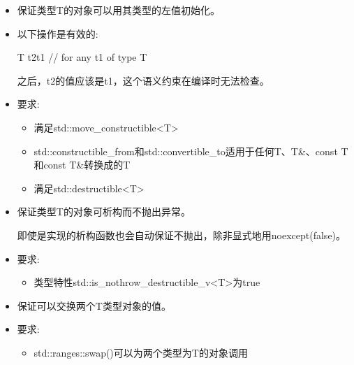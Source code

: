 \begin{itemize}
\item
保证类型T的对象可以用其类型的左值初始化。

\item
以下操作是有效的:

\begin{cpp}
T t2{t1} // for any t1 of type T
\end{cpp}

之后，t2的值应该是t1，这个语义约束在编译时无法检查。

\item
要求:
\begin{itemize}
\item
满足std::move\_constructible<T>

\item
std::constructible\_from和std::convertible\_to适用于任何T、T\&、const T和const T\&转换成的T

\item
满足std::destructible<T>
\end{itemize}
\end{itemize}


\begin{itemize}
\item
保证类型T的对象可析构而不抛出异常。

即使是实现的析构函数也会自动保证不抛出，除非显式地用noexcept(false)。

\item
要求:
\begin{itemize}
\item
类型特性std::is\_nothrow\_destructible\_v<T>为true
\end{itemize}
\end{itemize}


\begin{itemize}
\item
保证可以交换两个T类型对象的值。

\item
要求:
\begin{itemize}
\item
std::ranges::swap()可以为两个类型为T的对象调用
\end{itemize}
\end{itemize}



